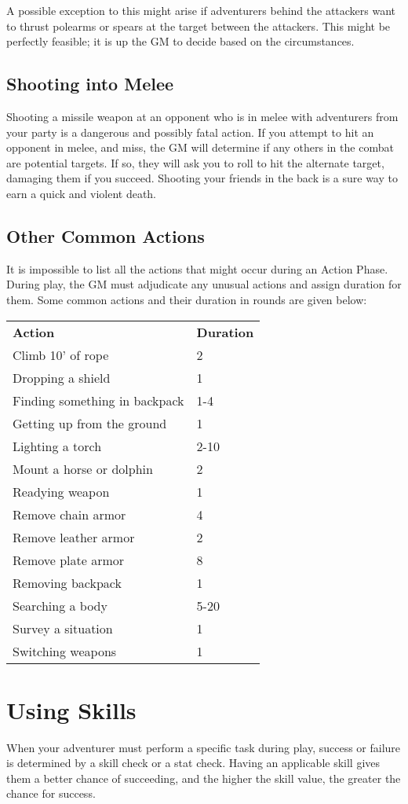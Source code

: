 \begin{multicols*}{2}
A possible exception to this might arise if adventurers behind the attackers want to thrust polearms or spears at the target between the attackers. This might be perfectly feasible; it is up the GM to decide based on the circumstances.
\subsection{Shooting into Melee}
Shooting a missile weapon at an opponent who is in melee with adventurers from your party is a dangerous and possibly fatal action. If you attempt to hit an opponent in
melee, and miss, the GM will determine if any others in the combat are potential targets. If so, they will ask you to roll to hit the alternate target, damaging them if you succeed. Shooting your friends in the back is a sure way to earn a quick and violent death.
\subsection{Other Common Actions}
It is impossible to list all the actions that might occur during an Action Phase. During play, the GM must adjudicate any unusual actions and assign duration for them. Some common actions and their duration in rounds are given below:
\begin{normbox}
\begin{tabular}{l l}
\textbf{Action} & \textbf{Duration}\\
Climb 10' of rope & 2\\
Dropping a shield & 1\\
Finding something in backpack & 1-4\\
Getting up from the ground & 1\\
Lighting a torch & 2-10\\
Mount a horse or dolphin & 2\\
Readying weapon & 1\\
Remove chain armor & 4\\
Remove leather armor & 2\\
Remove plate armor & 8\\
Removing backpack & 1\\
Searching a body & 5-20\\
Survey a situation & 1\\
Switching weapons & 1\\
\end{tabular}
\end{normbox}
\section{Using Skills}
When your adventurer must perform a specific task during play, success or failure is determined by a skill check or a stat check. Having an applicable skill gives them a better chance of succeeding, and the higher the skill value, the greater the chance for success.


\end{multicols*}
